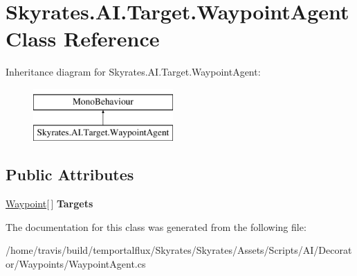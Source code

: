 \hypertarget{class_skyrates_1_1_a_i_1_1_target_1_1_waypoint_agent}{\section{Skyrates.\-A\-I.\-Target.\-Waypoint\-Agent Class Reference}
\label{class_skyrates_1_1_a_i_1_1_target_1_1_waypoint_agent}
}
Inheritance diagram for Skyrates.\-A\-I.\-Target.\-Waypoint\-Agent\-:\begin{figure}[H]
\begin{center}
\leavevmode
\includegraphics[height=2.000000cm]{class_skyrates_1_1_a_i_1_1_target_1_1_waypoint_agent}
\end{center}
\end{figure}
\subsection*{Public Attributes}
\begin{DoxyCompactItemize}
\item 
\hypertarget{class_skyrates_1_1_a_i_1_1_target_1_1_waypoint_agent_a938db2d0006c7f1af2582fa3651d6a8a}{\hyperlink{class_skyrates_1_1_a_i_1_1_target_1_1_waypoint}{Waypoint}\mbox{[}$\,$\mbox{]} {\bfseries Targets}}\label{class_skyrates_1_1_a_i_1_1_target_1_1_waypoint_agent_a938db2d0006c7f1af2582fa3651d6a8a}

\end{DoxyCompactItemize}


The documentation for this class was generated from the following file\-:\begin{DoxyCompactItemize}
\item 
/home/travis/build/temportalflux/\-Skyrates/\-Skyrates/\-Assets/\-Scripts/\-A\-I/\-Decorator/\-Waypoints/Waypoint\-Agent.\-cs\end{DoxyCompactItemize}
